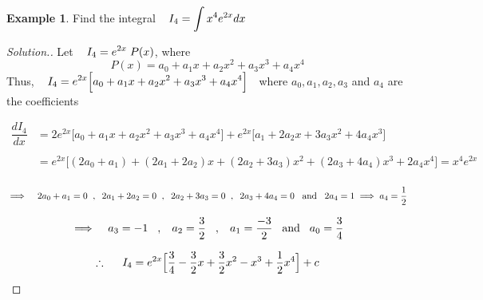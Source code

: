 \documentclass[11pt,a4paper]{article}
\theoremstyle{definition}
\newtheorem{exa}[thm]{Example}
\newenvironment{solution}
  {\renewcommand{\qedsymbol}{}\begin{proof}[\textit{Solution}.]}
  {\end{proof}}
\begin{document}
\begin{exa}


Find the integral $\hspace{0.3cm} I_4 = \displaystyle{\int x^4e^{2x}dx}$
\end{exa}


\begin{solution}


Let $\hspace{0.3cm} I_4 = \displaystyle{e^{2x}\hspace{0.1cm}P(x)}$, where
$$P(x) = a_0 + a_1x + a_2x^2 + a_3x^3 + a_4x^4$$
Thus, $\hspace{0.3cm}\displaystyle{I_4 = e^{2x}\Big[a_0 + a_1x + a_2x^2 + a_3x^3 + a_4x^4 \Big]}\hspace{0.2cm}$ where $a_0,a_1, a_2, a_3$ and $a_4$ are the coefficients

\begin{align*}
\dfrac{d I_4}{dx} & = 2e^{2x}\Big[a_0 + a_1x + a_2x^2 + a_3x^3 + a_4x^4\Big] + e^{2x}\Big[a_1 + 2a_2x + 3a_3x^2 + 4a_4x^3\Big]\\\\
& = e^{2x}\Big[(2a_0+a_1) + (2a_1 + 2a_2) x + (2a_2 + 3a_3)x^2 + (2a_3 + 4a_4)x^3 + 2a_4x^4\Big] = x^4e^{2x}\\
\end{align*}

$$\implies\hspace{0.3cm} 2a_0 + a_1 = 0\hspace{0.2cm}, \hspace{0.2cm} 2a_1 + 2a_2 = 0\hspace{0.2cm}, \hspace{0.2cm} 2a_2 + 3a_3 = 0\hspace{0.2cm} , \hspace{0.2cm} 2a_3 + 4a_4=0\hspace{0.3cm} \text{and}\hspace{0.3cm} 2a_4 = 1 \implies a_4 = \dfrac{1}{2}$$

$$\implies\hspace{0.3cm} a_3 = -1\hspace{0.3cm}, \hspace{0.3cm} a_2 = \dfrac{3}{2}\hspace{0.3cm} , \hspace{0.3cm} a_1 = \dfrac{-3}{2} \hspace{0.3cm}\text{and}\hspace{0.3cm} a_0 = \dfrac{3}{4}$$


$$\therefore\hspace{0.5cm} I_4 = e^{2x}\Big[\dfrac{3}{4} - \dfrac{3}{2}x + \dfrac{3}{2}x^2 - x^3 + \dfrac{1}{2}x^4\Big] + c$$
\end{solution}
\end{document}
